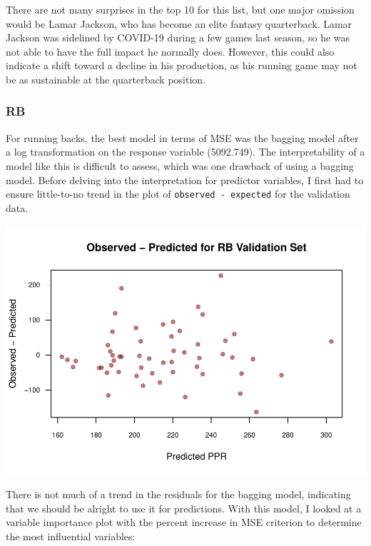 \documentclass[
]{article}
\begin{document}
There are not many surprises in the top 10 for this list, but one major
omission would be Lamar Jackson, who has become an elite fantasy
quarterback. Lamar Jackson was sidelined by COVID-19 during a few games
last season, so he was not able to have the full impact he normally
does. However, this could also indicate a shift toward a decline in his
production, as his running game may not be as sustainable at the
quarterback position.

\hypertarget{rb}{%
\subsubsection{RB}\label{rb}}

For running backs, the best model in terms of MSE was the bagging model
after a log transformation on the response variable (5092.749). The
interpretability of a model like this is difficult to assess, which was
one drawback of using a bagging model. Before delving into the
interpretation for predictor variables, I first had to ensure
little-to-no trend in the plot of \texttt{observed\ -\ expected} for the
validation data.

\begin{center}\includegraphics[width=0.85\linewidth]{stats_199_final_report_files/figure-latex/unnamed-chunk-7-1} \end{center}

There is not much of a trend in the residuals for the bagging model,
indicating that we should be alright to use it for predictions. With
this model, I looked at a variable importance plot with the percent
increase in MSE criterion to determine the most influential variables:
\end{document}

